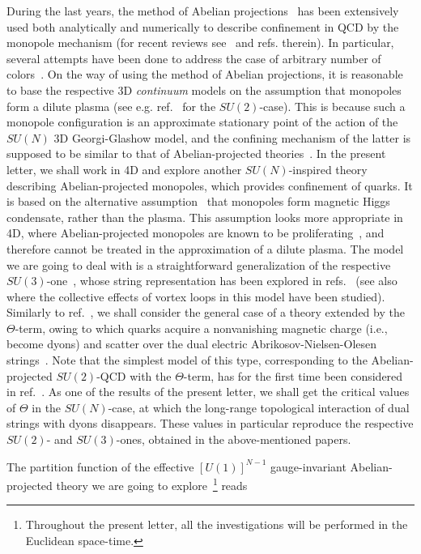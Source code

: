 \documentclass[a4paper,12pt]{article}
\begin{document}
During the last years,
the method of Abelian projections~\cite{th} has been extensively used
both analytically and numerically to describe confinement
in QCD by the monopole mechanism (for recent reviews see~\cite{digiacomo} and refs. therein).
In particular, several attempts have been done to address the case of arbitrary number of colors~\cite{suN, suNN}.
On the way of using the method of Abelian projections, it is reasonable to base the respective 3D {\it continuum} models on the
assumption that monopoles form a dilute plasma (see e.g. ref.~\cite{dw} for the $SU(2)$-case).
This is because such a monopole configuration is an approximate stationary point of the
action of the $SU(N)$ 3D Georgi-Glashow model, and the confining mechanism of the latter is supposed to be
similar to that of Abelian-projected theories~\cite{th}.
In the present letter, we shall work in 4D and explore another
$SU(N)$-inspired theory describing Abelian-projected monopoles, which provides confinement of quarks.
It is based on the alternative assumption~\cite{tHM} that monopoles form magnetic
Higgs condensate, rather than the plasma. This assumption looks more appropriate in 4D, where Abelian-projected monopoles are known to be
proliferating~\cite{pb}, and therefore cannot be treated in the approximation of a dilute plasma.
The model we are going to deal with is a straightforward generalization of the respective $SU(3)$-one~\cite{maedan},
whose string representation
has been explored in refs.~\cite{su3, theta} (see also~\cite{moresu3} where the collective effects of vortex loops in this model
have been studied).
Similarly to ref.~\cite{theta}, we shall consider the general case of a
theory extended by the $\Theta$-term, owing to which quarks acquire a nonvanishing magnetic charge (i.e., become dyons)
and scatter over the dual electric Abrikosov-Nielsen-Olesen strings~\cite{ano}. Note that the simplest model
of this type, corresponding to the Abelian-projected $SU(2)$-QCD with the $\Theta$-term, has for the first time
been considered in ref.~\cite{emil}. As one of the results of the present letter, we shall get the
critical values of $\Theta$ in the $SU(N)$-case, at which the long-range topological interaction of dual strings
with dyons disappears. These values in particular reproduce the respective $SU(2)$- and $SU(3)$-ones, obtained in the above-mentioned
papers.


The partition function of the
effective $[U(1)]^{N-1}$ gauge-invariant Abelian-projected theory
we are going to explore~\footnote{
Throughout the present letter,
all the investigations will be performed in the Euclidean space-time.}
reads
\end{document}
